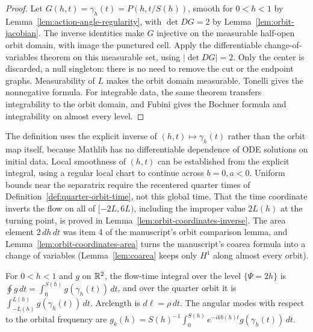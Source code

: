 \begin{proof}
\leanok
Let $G(h,t)=\gamma_h(t)=P(h,t/S(h))$, smooth for $0<h<1$ by
Lemma~\ref{lem:action-angle-regularity}, with $\det DG=2$ by
Lemma~\ref{lem:orbit-jacobian}.
The inverse identities make $G$ injective on the measurable half-open
orbit domain, with image the punctured cell. Apply the differentiable
change-of-variables theorem on this measurable set, using $|\det DG|=2$.
Only the center is discarded, a null singleton: there is no need to
remove the cut or the endpoint graphs. Measurability of $L$ makes the
orbit domain measurable. Tonelli gives the nonnegative formula.
For integrable data, the same theorem transfers integrability to the
orbit domain, and Fubini gives the Bochner formula and integrability
on almost every level.
\end{proof}

\begin{remark}
The definition uses the explicit inverse of $(h,t)\mapsto\gamma_h(t)$ rather than the
orbit map itself, because Mathlib has no differentiable dependence of ODE solutions on
initial data. Local smoothness of $(h,t)$ can be established from the explicit integral,
using a regular local chart to continue across $b=0,a<0$. Uniform bounds near the
separatrix require the recentered quarter times of
Definition~\ref{def:quarter-orbit-time}, not this global time. That the time
coordinate inverts the flow on all of $[-2L,6L)$, including the improper value
$2L(h)$ at the turning point, is proved in Lemma~\ref{lem:orbit-coordinates-inverse}.
The area element $2\,dh\,dt$ was item 4 of the manuscript's orbit comparison
lemma, and Lemma~\ref{lem:orbit-coordinates-area} turns the manuscript's coarea formula into a change of variables
(Lemma~\ref{lem:coarea} keeps only $H^1$ along almost every orbit).
\end{remark}

\begin{definition}
\label{def:level-integral}
\leanok
For $0<h<1$ and $g$ on $\mathbb{R}^2$, the flow-time integral over the level $\{\Psi=2h\}$ is
$\oint g\,dt=\int_0^{S(h)}g(\gamma_h(t))\,dt$, and over the quarter orbit it is
$\int_{-L(h)}^{L(h)}g(\gamma_h(t))\,dt$. Arclength is $d\ell=\rho\,dt$. The angular modes
with respect to the orbital frequency are
$g_k(h)=S(h)^{-1}\int_0^{S(h)}e^{-ikb(h)t}g(\gamma_h(t))\,dt$.
\end{definition}


